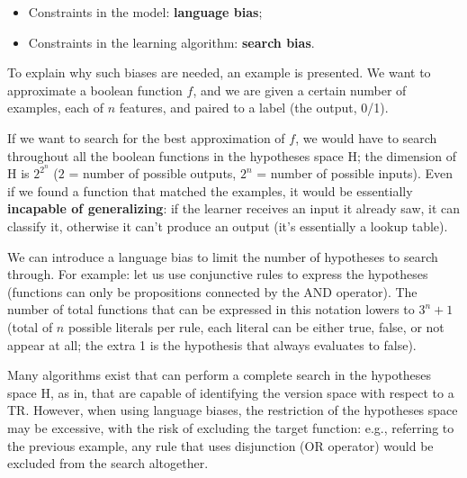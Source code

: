 \begin{itemize}
    \item Constraints in the model: \textbf{language bias};
    \item Constraints in the learning algorithm: \textbf{search bias}.
\end{itemize}

To explain why such biases are needed, an example is presented.
We want to approximate a boolean function $f$, and we are given a certain number of examples, each of $n$ features, and paired to a label (the output, 0/1).

If we want to search for the best approximation of $f$, we would have to search throughout all the boolean functions in the hypotheses space H; the dimension of H is $2^{2^n}$ ($2$ = number of possible outputs, $2^n$ = number of possible inputs). Even if we found a function that matched the examples, it would be essentially \textbf{incapable of generalizing}: if the learner receives an input it already saw, it can classify it, otherwise it can't produce an output (it's essentially a lookup table). 

\begin{center}
    \vspace{5mm}
    \vspace{5mm}
\end{center}

We can introduce a language bias to limit the number of hypotheses to search through.
For example: let us use conjunctive rules to express the hypotheses (functions can only be propositions connected by the AND operator). The number of total functions that can be expressed in this notation lowers to $3^n + 1$ (total of $n$ possible literals per rule, each literal can be either true, false, or not appear at all; the extra 1 is the hypothesis that always evaluates to false).


Many algorithms exist that can perform a complete search in the hypotheses space H, as in, that are capable of identifying the version space with respect to a TR. However, when using language biases, the restriction of the hypotheses space may be excessive, with the risk of excluding the target function: e.g., referring to the previous example, any rule that uses disjunction (OR operator) would be excluded from the search altogether.


